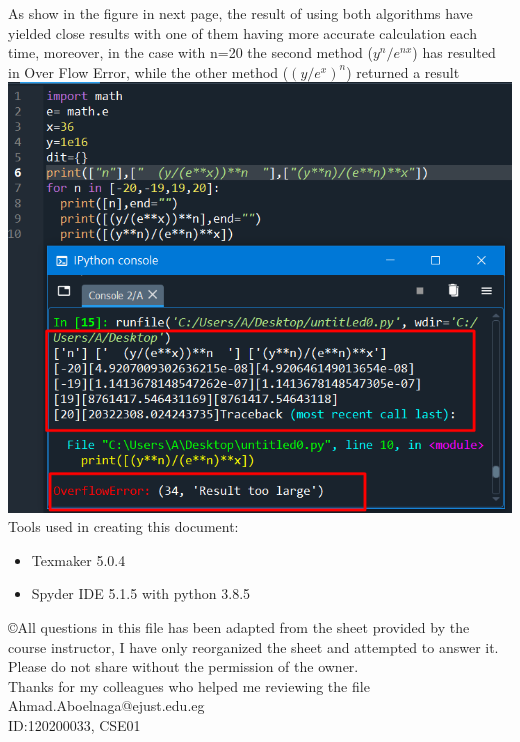 \documentclass[a4paper,12pt]{article}
\begin{document}
 \color{black} As show in the figure in next page, the result of using both algorithms have yielded close results with one of them having more accurate calculation each time, moreover, in the case with n=20 the second method ($y^n/e^{nx}$) has resulted in Over Flow Error, while the other method ($(y/e^x)^n$) returned a result
 \newpage
 \includegraphics[scale=1.4]{Q8.png}\\[2cm]
 Tools used in creating this document:
 \begin{itemize}
 \item Texmaker 5.0.4
 \item Spyder IDE 5.1.5 with python 3.8.5
\end{itemize}  
 
 \copyright All questions in this file has been adapted from the sheet provided by the course instructor, I have only reorganized the sheet and attempted to answer it. Please do not share without the permission of the owner.\\
Thanks for my colleagues who helped me reviewing the file\\
\color{blue}Ahmad.Aboelnaga@ejust.edu.eg\\
ID:120200033, CSE01
 
  
\end{document}
